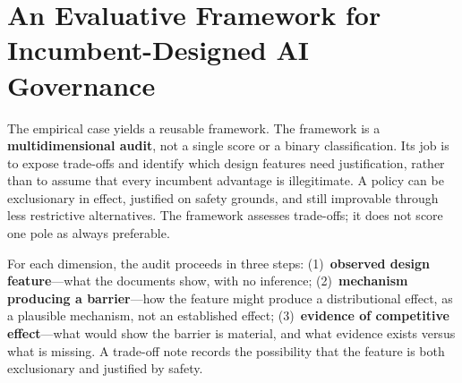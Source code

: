 \section{An Evaluative Framework for Incumbent-Designed AI Governance}

The empirical case yields a reusable framework. The framework is a \textbf{multidimensional audit}, not a single score or a binary classification. Its job is to expose trade-offs and identify which design features need justification, rather than to assume that every incumbent advantage is illegitimate. A policy can be exclusionary in effect, justified on safety grounds, and still improvable through less restrictive alternatives. The framework assesses trade-offs; it does not score one pole as always preferable.

For each dimension, the audit proceeds in three steps: (1)~\textbf{observed design feature}---what the documents show, with no inference; (2)~\textbf{mechanism producing a barrier}---how the feature might produce a distributional effect, as a plausible mechanism, not an established effect; (3)~\textbf{evidence of competitive effect}---what would show the barrier is material, and what evidence exists versus what is missing. A trade-off note records the possibility that the feature is both exclusionary and justified by safety.

